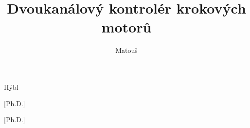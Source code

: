 
\usepackage[
 czech-english,		%
%
    master,			  %
%
    center,			    %
%
]{thesis}   %


\author[Bc.]{Matouš}{Hýbl}


[Ph.D.]

[Ph.D.]

\title[Two channel stepper motor controller]{Dvoukanálový kontrolér krokových motorů}

